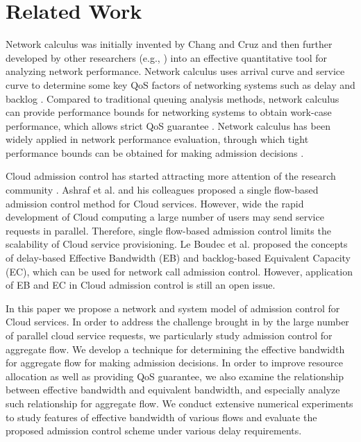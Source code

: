 \documentclass[a4paper]{article}
\begin{document}
\section{Related Work}

Network calculus was initially invented by Chang \cite{chang2000} and Cruz \cite{cruz1, cruz2} and then further developed by other researchers (e.g., \cite{parekh1993, agrawal1999, jiang2008, le1998}) into an effective quantitative tool for analyzing network performance. Network calculus uses arrival curve and service curve to determine some key QoS factors of networking systems such as delay and backlog \cite{ciucu2012, bouillard2008}. Compared to traditional queuing analysis methods, network calculus can provide performance bounds for networking systems to obtain work-case performance, which allows strict QoS guarantee \cite{bisti2012, bouillard2010}. Network calculus has been widely applied in network performance evaluation, through which tight performance bounds can be obtained for making admission decisions \cite{shan1998, schmitt2008}.

Cloud admission control has started attracting more attention of the research community \cite{ashraf2013, wu2012}. Ashraf et al. \cite{ashraf2013} and his colleagues proposed a single flow-based admission control method for Cloud services. However, wide the rapid development of Cloud computing a large number of users may send service requests in parallel. Therefore, single flow-based admission control limits the scalability of Cloud service provisioning. Le Boudec et al. \cite{le2001} proposed the concepts of delay-based Effective Bandwidth (EB) and backlog-based Equivalent Capacity (EC), which can be used for network call admission control. However, application of EB and EC in Cloud admission control is still an open issue.

In this paper we propose a network and system model of admission control for Cloud services. In order to address the challenge brought in by the large number of parallel cloud service requests, we particularly study admission control for aggregate flow. We develop a technique for determining the effective bandwidth for aggregate flow for making admission decisions. In order to improve resource allocation as well as providing QoS guarantee, we also examine the relationship between effective bandwidth and equivalent bandwidth, and especially analyze such relationship for aggregate flow. We conduct extensive numerical experiments to study features of effective bandwidth of various flows and evaluate the proposed admission control scheme under various delay requirements.
\end{document}
